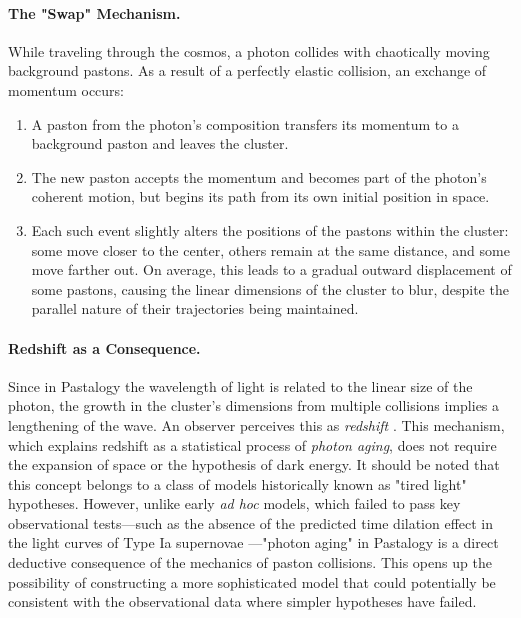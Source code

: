 \documentclass[pdflatex,sn-mathphys-num,referee]{sn-jnl}
\begin{document}
\paragraph{The "Swap" Mechanism.}
While traveling through the cosmos, a photon collides with chaotically moving background pastons. As a result of a perfectly elastic collision, an exchange of momentum occurs:
\begin{enumerate}
  \item A paston from the photon's composition transfers its momentum to a background paston and leaves the cluster.
  \item The new paston accepts the momentum and becomes part of the photon's coherent motion, but begins its path from its own initial position in space.
  \item Each such event slightly alters the positions of the pastons within the cluster: some move closer to the center, others remain at the same distance, and some move farther out. On average, this leads to a gradual outward displacement of some pastons, causing the linear dimensions of the cluster to blur, despite the parallel nature of their trajectories being maintained.
\end{enumerate}

\paragraph{Redshift as a Consequence.}
Since in Pastalogy the wavelength of light is related to the linear size of the photon, the growth in the cluster's dimensions from multiple collisions implies a lengthening of the wave. An observer perceives this as \emph{redshift} \cite{hubble1929}. This mechanism, which explains redshift as a statistical process of \emph{photon aging}, does not require the expansion of space or the hypothesis of dark energy. It should be noted that this concept belongs to a class of models historically known as "tired light" hypotheses. However, unlike early \textit{ad hoc} models, which failed to pass key observational tests---such as the absence of the predicted time dilation effect in the light curves of Type Ia supernovae \cite{goldhaber2001-dilation}---"photon aging" in Pastalogy is a direct deductive consequence of the mechanics of paston collisions. This opens up the possibility of constructing a more sophisticated model that could potentially be consistent with the observational data where simpler hypotheses have failed.
\end{document}
